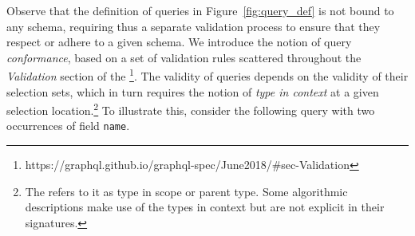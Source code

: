 Observe that the definition of queries in Figure~\ref{fig:query_def} is not bound to any schema, requiring thus a separate validation process to ensure that they respect or adhere to a given schema. We introduce the notion of query \textit{conformance}, based on a set of validation rules scattered throughout the \textit{Validation} section of the \spec\footnote{https://graphql.github.io/graphql-spec/June2018/\#sec-Validation}. The validity of queries depends on the validity of their selection sets, which in turn requires the notion of \textit{type in context} at a given selection location.\footnote{The \spec refers to it as type in scope or parent type. Some algorithmic descriptions make use of the types in context but are not explicit in their signatures.} %
To illustrate this, consider the following query with two occurrences of field \texttt{name}.

